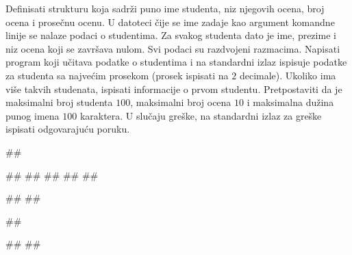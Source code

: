 \begin{Exercise}[label=p3_x3]         
Definisati strukturu  koja sadrži puno ime studenta, niz njegovih ocena, broj ocena i 
prosečnu ocenu.
U datoteci čije se ime zadaje kao argument komandne linije se nalaze podaci o studentima. 
Za svakog studenta dato je ime, prezime i niz ocena koji se završava nulom. 
Svi podaci su razdvojeni razmacima. Napisati program koji učitava podatke o studentima i
na standardni izlaz ispisuje podatke za studenta sa najvećim prosekom (prosek ispisati na $2$ decimale).
Ukoliko ima više takvih studenata, ispisati informacije o prvom studentu.
Pretpostaviti da je maksimalni broj studenta $100$, maksimalni broj ocena $10$ i
maksimalna dužina punog imena $100$ karaktera. 
U slučaju greške, na standardni izlaz za greške ispisati odgovarajuću poruku.


\begin{miditest}
\begin{upotreba}{1}
##

##
##
##
##
##

#\naslovIzlaz#
##
\end{upotreba}
\end{miditest}
\begin{miditest}
\begin{upotreba}{2}
##

#\naslovIzlazZaGresku#
##
\end{upotreba}
\end{miditest}
\end{Exercise}
\begin{Answer}[ref=p3_x3]
\end{Answer}


